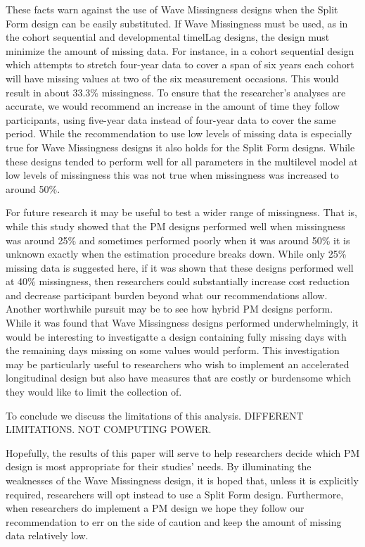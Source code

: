 \documentclass{svjour3}\usepackage[]{graphicx}\usepackage[]{color}
\begin{document}
These facts warn against the use of Wave Missingness designs when the Split Form design can be easily substituted. If Wave Missingness must be used, as in the cohort sequential and developmental timelLag designs, the design must minimize the amount of missing data. For instance, in a cohort sequential design which attempts to stretch four-year data to cover a span of six years each cohort will have missing values at two of the six measurement occasions. This would result in about 33.3\% missingness. To ensure that the researcher's analyses are accurate, we would recommend an increase in the amount of time they follow participants, using five-year data instead of four-year data to cover the same period. While the recommendation to use low levels of missing data is especially true for Wave Missingness designs it also holds for the Split Form designs. While these designs tended to perform well for all parameters in the multilevel model at low levels of missingness this was not true when missingness was increased to around 50\%. \par

For future research it may be useful to test a wider range of missingness. That is, while this study showed that the PM designs performed well when missingness was around 25\% and sometimes performed poorly when it was around 50\% it is unknown exactly when the estimation procedure breaks down. While only 25\% missing data is suggested here, if it was shown that these designs performed well at 40\% missingness, then researchers could substantially increase cost reduction and decrease participant burden beyond what our recommendations allow. Another worthwhile pursuit may be to see how hybrid PM designs perform. While it was found that Wave Missingness designs performed underwhelmingly, it would be interesting to investigatte a design containing fully missing days with the remaining days missing on some values would perform. This investigation may be particularly useful to researchers who wish to implement an accelerated longitudinal design but also have measures that are costly or burdensome which they would like to limit the collection of. \par

To conclude we discuss the limitations of this analysis. DIFFERENT LIMITATIONS. NOT COMPUTING POWER.

Hopefully, the results of this paper will serve to help researchers decide which PM design is most appropriate for their studies' needs. By illuminating the weaknesses of the Wave Missingness design, it is hoped that, unless it is explicitly required, researchers will opt instead to use a Split Form design. Furthermore, when researchers do implement a PM design we hope they follow our recommendation to err on the side of caution and keep the amount of missing data relatively low. \par



\end{document}
